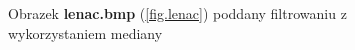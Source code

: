 \documentclass{classrep}
\begin{document}
\begin{figure}
{{  \label{fig.lenac_median_5x5}
 }
}
\caption{Obrazek \textbf{lenac.bmp} (\ref{fig.lenac}) poddany filtrowaniu z wykorzystaniem mediany}
\label{fig.lenac_median}
\end{figure}
\end{document}
